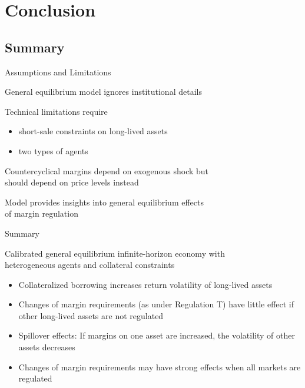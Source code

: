 \documentclass[large]{beamer}
\begin{document}
\section{Conclusion}
%
\subsection{Summary}
%
\begin{frame}{Assumptions and Limitations}

General equilibrium model ignores institutional details

\bigskip

Technical limitations require
\begin{itemize}
\item short-sale constraints on long-lived assets
\item two types of agents
\end{itemize}

\bigskip

Countercyclical margins depend on exogenous shock but\\
\mbox{} \hspace{0.25cm} should depend on price levels instead

\bigskip

\pause

\bigskip

Model provides insights into {\color{red} general equilibrium effects}\\
\mbox{} \hspace{0.25cm} of {\color{red} margin regulation}

\end{frame}
%
\begin{frame}{Summary}

Calibrated general equilibrium infinite-horizon economy with\\
\mbox{} \hspace{0.25cm} heterogeneous agents and collateral constraints

\begin{itemize}
\item Collateralized borrowing increases return volatility of long-lived assets

\item Changes of margin requirements (as under Regulation T) have little effect if other long-lived assets are not regulated

\item Spillover effects: If margins on one asset are increased, the volatility of other assets decreases

\item Changes of margin requirements may have strong effects when all markets are regulated
\end{itemize}

\end{frame}
%
\end{document}
